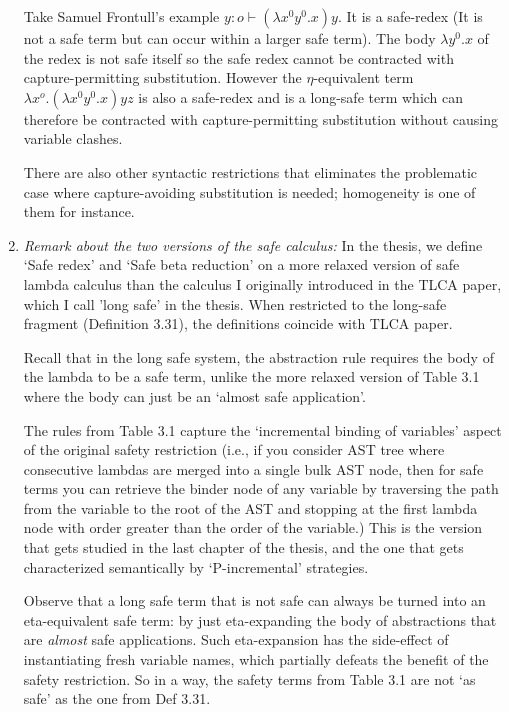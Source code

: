 \documentclass[12pt]{article}
\begin{document}
\begin{enumerate}
Take Samuel Frontull's example $y:o \vdash (\lambda x^0 y^0 .x) y $. It is a safe-redex (It is not a safe term but can occur within a larger safe term). The body $ \lambda y^0 .x$ of the redex is not safe itself so
the safe redex cannot be contracted with capture-permitting substitution.
However the $\eta$-equivalent term $\lambda x^o . (\lambda x^0 y^0 .x) y z$ is also a safe-redex and is a long-safe term which can therefore be contracted with capture-permitting substitution without causing variable clashes.


There are also other syntactic restrictions that eliminates the problematic case where capture-avoiding substitution is needed; homogeneity is one of them for instance.



\item \emph{Remark about the two versions of the safe calculus:} In the thesis, we define `Safe redex' and `Safe beta reduction' on a more relaxed version of safe lambda calculus than the calculus I originally introduced in the TLCA paper, which I call 'long safe' in the thesis. When restricted to the long-safe fragment (Definition 3.31), the definitions coincide with TLCA paper.

Recall that in the long safe system, the abstraction rule requires the body of the lambda to be a safe term,
unlike the more relaxed version of Table 3.1 where the body can just be an `almost safe application'.

The rules from Table 3.1 capture the `incremental binding of variables' aspect of the original safety restriction (i.e., if you consider AST tree
where consecutive lambdas are merged into a single bulk AST node, then for safe terms you can retrieve the binder node of any variable by traversing the path from
the variable to the root of the AST and stopping at the first lambda node with order greater than the order of the variable.)
This is the version that gets studied in the last chapter of the thesis, and
the one that gets characterized semantically by `P-incremental' strategies.

Observe that a long safe term that is not safe can always be turned into an eta-equivalent safe term: by just eta-expanding
the body of abstractions that are \emph{almost} safe applications. Such eta-expansion has the side-effect
 of instantiating fresh variable names, which partially defeats the benefit of the safety restriction.
 So in a way, the safety terms from Table 3.1 are not `as safe' as the one from Def 3.31.


\end{enumerate}
\end{document}

